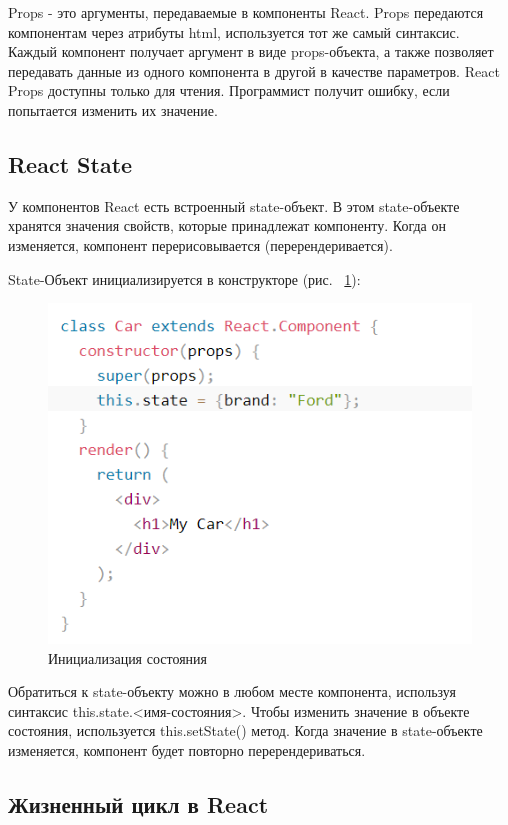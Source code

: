 \documentclass[14pt, a4paper]{diplom}
\begin{document}
Props - это аргументы, передаваемые в компоненты React.
Props передаются компонентам через атрибуты html, используется тот же самый синтаксис. Каждый компонент получает аргумент в виде props-объекта, а также позволяет передавать данные из одного компонента в другой в качестве параметров. React Props доступны только для чтения. Программист получит ошибку, если попытается изменить их значение.

\subsection{React State}
У компонентов React есть встроенный state-объект.
В этом state-объекте хранятся значения свойств, которые принадлежат компоненту.
Когда он изменяется, компонент перерисовывается (перерендеривается).

State-Объект инициализируется в конструкторе (рис. ~\ref{b}):

\begin{figure}[!ht]
\centering
\includegraphics[width=1\textwidth]{resources/state.png}
\caption{Инициализация состояния}
\label{b}
\end{figure}

Обратиться к state-объекту можно в любом месте компонента, используя синтаксис this.state.<имя-состояния>. Чтобы изменить значение в объекте состояния, используется this.setState() метод.
Когда значение в state-объекте изменяется, компонент будет повторно перерендериваться.

\subsection{Жизненный цикл в React}
\end{document}
